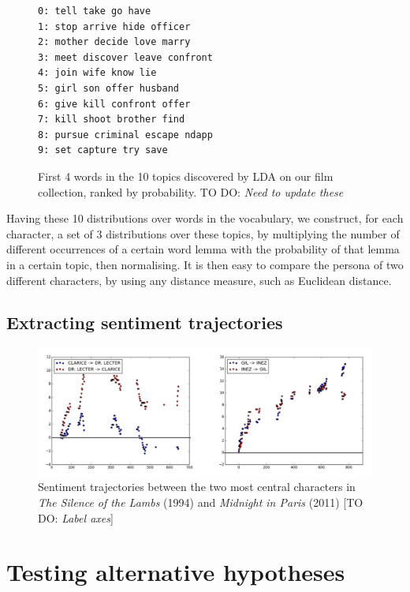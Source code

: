 \documentclass[bsc,frontabs,singlespacing,parskip]{infthesis} %
\begin{document}
\begin{figure}[h]
\centering
\begin{minipage}{8cm}
\begin{Verbatim}[frame=single]
0: tell take go have 
1: stop arrive hide officer 
2: mother decide love marry 
3: meet discover leave confront 
4: join wife know lie 
5: girl son offer husband 
6: give kill confront offer
7: kill shoot brother find 
8: pursue criminal escape ndapp
9: set capture try save 
\end{Verbatim}
\end{minipage}
\caption{First 4 words in the 10 topics discovered by LDA on our film collection, ranked by probability. TO DO: \textit{Need to update these}}
\label{topics}
\end{figure}

Having these 10 distributions over words in the vocabulary, we construct, for each character, a set of 3 distributions over these topics, by multiplying the number of different occurrences of a certain word lemma with the probability of that lemma in a certain topic, then normalising. It is then easy to compare the persona of two different characters, by using any distance measure, such as Euclidean distance.


\subsection{Extracting sentiment trajectories}

\begin{figure}[h!]
	\includegraphics[scale=0.335]{sentiment}
	\caption{Sentiment trajectories between the two most central characters in \textit{The Silence of the Lambs} (1994) and \textit{Midnight in Paris} (2011) [TO DO: \textit{Label axes}]}
\end{figure}


\section{Testing alternative hypotheses}
\end{document}
